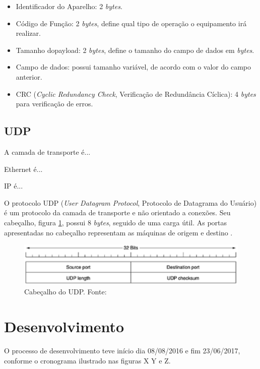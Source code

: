     \begin{itemize}
        \item Identificador do Aparelho: 2 \textit{bytes}.
        \item Código de Função: 2 \textit{bytes}, define qual tipo de operação o equipamento irá realizar.
        \item Tamanho do{payload}: 2 \textit{bytes}, define o tamanho do campo de dados em \textit{bytes}.
        \item Campo de dados: possui tamanho variável, de acordo com o valor do campo anterior.
        \item CRC (\textit{Cyclic Redundancy Check}, Verificação de Redundância Cíclica): 4 \textit{bytes} para verificação de erros.
    \end{itemize}

    \subsection{UDP}
    A camada de transporte é...

    Ethernet é...

    IP é...

    O protocolo UDP (\textit{User Datagram Protocol}, Protocolo de Datagrama do Usuário) é um protocolo da camada de transporte e não orientado a conexões. Seu cabeçalho, figura \ref{udp_header}, possui 8 \textit{bytes}, seguido de uma carga útil. As portas apresentadas no cabeçalho representam as máquinas de origem e destino \cite{tanenbaum_2002}.

    \begin{figure}[!htpb]
        \centering
        \includegraphics[keepaspectratio=true,scale=0.8]{figuras/udp_header.eps}
        \caption{Cabeçalho do UDP. Fonte: \cite{tanenbaum_2002}}
        \label{udp_header}
    \end{figure}

\section{Desenvolvimento}
O processo de desenvolvimento teve início dia 08/08/2016 e fim 23/06/2017, conforme o cronograma ilustrado nas figuras X Y e Z.
